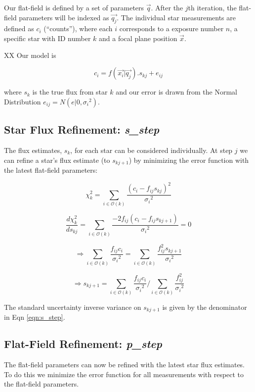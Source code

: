 \documentclass[12pt,a4paper,twoside]{article}
\begin{document}
Our flat-field is defined by a set of parameters $\vec{q}$. After the $j$th iteration, the flat-field parameters will be indexed as $\vec{q_j}$. The individual star measurements are defined as $c_i$ (``counts''), where each $i$ corresponds to a exposure number $n$, a specific star with ID number $k$ and a focal plane position $\vec{x}$.

XX Our model is

\begin{equation}
c_i = f(\vec{x_i} | \vec{q_j}) . s_{kj} + e_{ij}
\end{equation}

where $s_k$ is the true flux from star $k$ and our error is drawn from the Normal Distribution $e_{ij} = N(e|0,{\sigma_i}^2)$.

\subsection{Star Flux Refinement: \textbf{\textit{s\_step}}}
The flux estimates, $s_k$, for each star can be considered individually. At step $j$ we can refine a star's flux estimate (to $s_{kj+1}$) by minimizing the error function with the latest flat-field parameters:

\begin{equation}
\chi^2_{k} = \sum_{i \in \mathcal{O}(k)} \frac{(c_i-f_{ij}s_{kj})^2}{{\sigma_i}^2}
\end{equation}

\begin{equation}
\frac{d\chi^2_{k}}{d s_{kj}} = \sum_{i \in \mathcal{O}(k)} \frac{-2 f_{ij} (c_i-f_{ij}s_{kj+1})}{{\sigma_i}^2} = 0
\end{equation}

\begin{equation}
\Rightarrow \sum_{i \in \mathcal{O}(k)} \frac{f_{ij} c_i}{{\sigma_i}^2}= \sum_{i \in \mathcal{O}(k)} \frac{f_{ij}^2 s_{kj+1}}{{\sigma_i}^2}
\end{equation}

\begin{equation}
\Rightarrow s_{kj+1} = {\sum_{i \in \mathcal{O}(k)} \frac{f_{ij} c_i}{{\sigma_i}^2}}/{\sum_{i \in \mathcal{O}(k)} \frac{f_{ij}^2}{{\sigma_i}^2}} \label{eqn:s_step}
\end{equation}

The standard uncertainty inverse variance on $s_{kj+1}$ is given by the denominator in Eqn \ref{eqn:s_step}.

\subsection{Flat-Field Refinement: \textbf{\textit{p\_step}}}
The flat-field parameters can now be refined with the latest star flux estimates. To do this we minimize the error function for all measurements with respect to the flat-field parameters.
\end{document}
